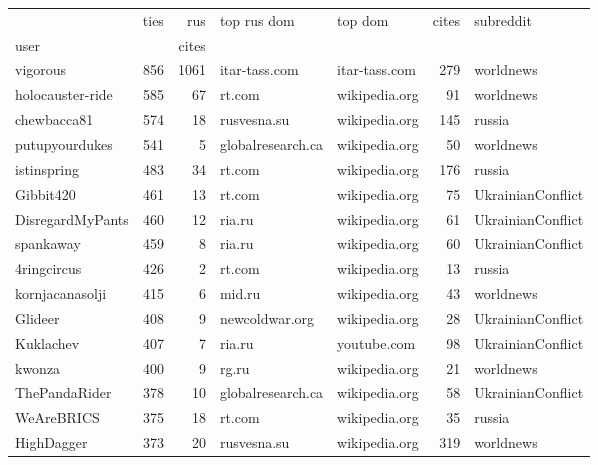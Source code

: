\begin{tabular}{lrrllrl}
\toprule
 & ties & rus & top rus dom & top dom & cites & subreddit \\
user & & cites & & & & \\
\midrule
vigorous         &   856 &       1061 &      itar-tass.com &  itar-tass.com &    279 &          worldnews \\
holocauster-ride &   585 &         67 &              rt.com &  wikipedia.org &     91 &          worldnews \\
chewbacca81      &   574 &         18 &         rusvesna.su &  wikipedia.org &    145 &             russia \\
putupyourdukes   &   541 &          5 &   globalresearch.ca &  wikipedia.org &     50 &          worldnews \\
istinspring      &   483 &         34 &              rt.com &  wikipedia.org &    176 &             russia \\
Gibbit420        &   461 &         13 &              rt.com &  wikipedia.org &     75 &  UkrainianConflict \\
DisregardMyPants &   460 &         12 &              ria.ru &  wikipedia.org &     61 &  UkrainianConflict \\
spankaway        &   459 &          8 &              ria.ru &  wikipedia.org &     60 &  UkrainianConflict \\
4ringcircus      &   426 &          2 &              rt.com &  wikipedia.org &     13 &             russia \\
kornjacanasolji  &   415 &          6 &              mid.ru &  wikipedia.org &     43 &          worldnews \\
Glideer          &   408 &          9 &      newcoldwar.org &  wikipedia.org &     28 &  UkrainianConflict \\
Kuklachev        &   407 &          7 &              ria.ru &    youtube.com &     98 &  UkrainianConflict \\
kwonza           &   400 &          9 &               rg.ru &  wikipedia.org &     21 &          worldnews \\
ThePandaRider    &   378 &         10 &   globalresearch.ca &  wikipedia.org &     58 &  UkrainianConflict \\
WeAreBRICS       &   375 &         18 &              rt.com &  wikipedia.org &     35 &             russia \\
HighDagger       &   373 &         20 &         rusvesna.su &  wikipedia.org &    319 &          worldnews \\

\end{tabular}
